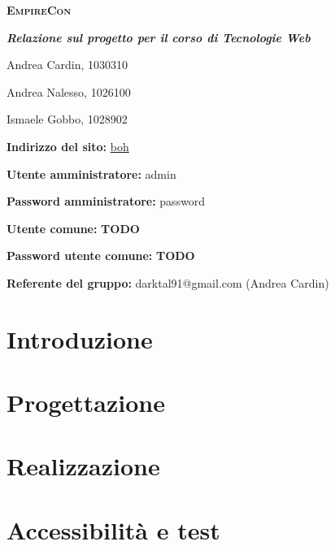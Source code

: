 \documentclass[12pt,a4paper]{article}
\begin{document}
\begin{titlepage}
	\centering
	\vspace*{1cm}
	{\scshape\LARGE \textbf{EmpireCon} \par}
	\vspace{0.5cm}
	{\Large \textbf{\textit{Relazione sul progetto per il corso di Tecnologie Web}}\par}
	\vspace{3cm}
	{\Large Andrea Cardin, 1030310\par}
	{\Large Andrea Nalesso, 1026100\par}
	{\Large Ismaele Gobbo, 1028902\par}
	\vspace{6cm}
	{\normalsize \textbf{Indirizzo del sito:} \url{boh}\par}
	{\normalsize \textbf{Utente amministratore:} admin\par}
	{\normalsize \textbf{Password amministratore:} password\par}
	{\normalsize \textbf{Utente comune:} \textbf{TODO}\par}
	{\normalsize \textbf{Password utente comune:} \textbf{TODO}\par}
	{\normalsize \textbf{Referente del gruppo:} darktal91@gmail.com (Andrea Cardin)\par}
	\vspace*{\fill}
\end{titlepage}

\tableofcontents
\newpage

% 
% 

\section{Introduzione}


\section{Progettazione}


\section{Realizzazione}


\section{Accessibilità e test}

\end{document}
